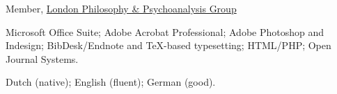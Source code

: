 \documentclass[11pt]{article}
\begin{document}
\ind Member, \href{http://www.philosophy-psychoanalysis.org.uk}{London Philosophy \& Psychoanalysis Group}

\bigskip

\medskip

\ind Microsoft Office Suite; Adobe Acrobat Professional; Adobe Photoshop and Indesign; BibDesk/Endnote and TeX-based typesetting; HTML/PHP; Open Journal Systems.

\bigskip 

\medskip

\ind Dutch (native); English (fluent); German (good).

\rfoot{\footnotesize{\today}}
\end{document}
